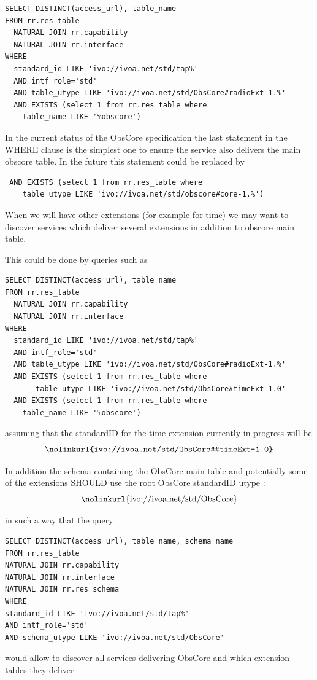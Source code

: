 \documentclass[11pt,a4paper]{ivoa}
\begin{document}
\begin{lstlisting}
SELECT DISTINCT(access_url), table_name
FROM rr.res_table
  NATURAL JOIN rr.capability
  NATURAL JOIN rr.interface
WHERE
  standard_id LIKE 'ivo://ivoa.net/std/tap%'
  AND intf_role='std'
  AND table_utype LIKE 'ivo://ivoa.net/std/ObsCore#radioExt-1.%'
  AND EXISTS (select 1 from rr.res_table where
    table_name LIKE '%obscore')
\end{lstlisting}

In the current status of the ObsCore specification the last statement in the WHERE clause
is the simplest one to ensure the service also delivers the main obscore table. 
In the future  this statement could be replaced   by 
\begin{lstlisting}
 AND EXISTS (select 1 from rr.res_table where
    table_utype LIKE 'ivo://ivoa.net/std/obscore#core-1.%')
\end{lstlisting}
 
When we will have other extensions (for example for time) we may want to 
discover services which deliver several extensions in addition to obscore 
main table.

This could be done by queries such as  

\begin{lstlisting}
SELECT DISTINCT(access_url), table_name
FROM rr.res_table
  NATURAL JOIN rr.capability
  NATURAL JOIN rr.interface
WHERE
  standard_id LIKE 'ivo://ivoa.net/std/tap%'
  AND intf_role='std'
  AND table_utype LIKE 'ivo://ivoa.net/std/ObsCore#radioExt-1.%'
  AND EXISTS (select 1 from rr.res_table where 
       table_utype LIKE 'ivo://ivoa.net/std/ObsCore#timeExt-1.0'
  AND EXISTS (select 1 from rr.res_table where
    table_name LIKE '%obscore')
\end{lstlisting}

assuming that the standardID for the time extension currently in progress will be 
$$
\hbox{\nolinkurl{ivo://ivoa.net/std/ObsCore#timeExt-1.0}}
$$

In addition the schema containing the ObsCore main table and potentially some of the  extensions
SHOULD use the root ObsCore standardID utype :
$$
\hbox{\nolinkurl{ivo://ivoa.net/std/ObsCore}}
$$


in such a way that the query

\begin{lstlisting}
SELECT DISTINCT(access_url), table_name, schema_name
FROM rr.res_table
NATURAL JOIN rr.capability
NATURAL JOIN rr.interface
NATURAL JOIN rr.res_schema
WHERE
standard_id LIKE 'ivo://ivoa.net/std/tap%'
AND intf_role='std'
AND schema_utype LIKE 'ivo://ivoa.net/std/ObsCore'
\end{lstlisting}

would allow to discover all services delivering ObsCore and which extension tables they deliver.


\appendix





\end{document}
